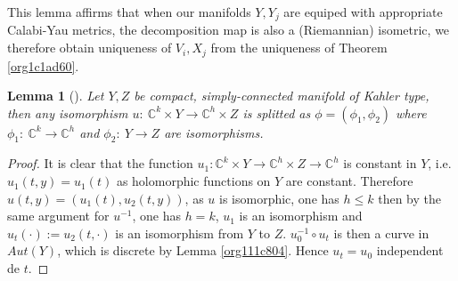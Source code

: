 \documentclass[11pt]{article}
\newtheorem{lemma}[theorem]{Lemma}
\begin{document}
This lemma affirms that when our manifolds \(Y, Y_j\) are equiped with appropriate Calabi-Yau metrics,
the decomposition map is also a (Riemannian) isometric, we therefore obtain uniqueness of \(V_i, X_j\)
from the uniqueness of Theorem \ref{org1c1ad60}.

\begin{lemma}[]
Let \(Y,Z\) be compact, simply-connected manifold of Kahler type, then any isomorphism \(u:\
\mathbb{C}^k\times Y\longrightarrow \mathbb{C}^h\times Z\) is splitted as \(\phi = (\phi_1,\phi_2)\)
where \(\phi_1:\ \mathbb{C}^k\longrightarrow \mathbb{C}^h\) and \(\phi_2:\ Y\longrightarrow Z\) are
isomorphisms.
\end{lemma}
\begin{proof}
It is clear that the function \(u_1: \mathbb{C}^k\times Y \longrightarrow \mathbb{C}^h \times Z
\longrightarrow \mathbb{C}^h\) is constant in \(Y\), i.e. \(u_1(t,y) = u_1(t)\) as holomorphic
functions on \(Y\) are constant. Therefore  \(u(t,y) = (u_1(t), u_2(t,y))\), as \(u\) is isomorphic, one
has \(h\leq k\) then by the same argument for \(u^{-1}\), one has \(h=k\), \(u_1\) is an isomorphism and
\(u_t(\cdot) := u_2(t,\cdot)\) is an isomorphism from \(Y\) to \(Z\). \(u_0^{-1}\circ u_t\) is then a curve in
\(Aut(Y)\), which is discrete by Lemma \ref{org111c804}. Hence \(u_t= u_0\) independent de \(t\).
\end{proof}
\end{document}
